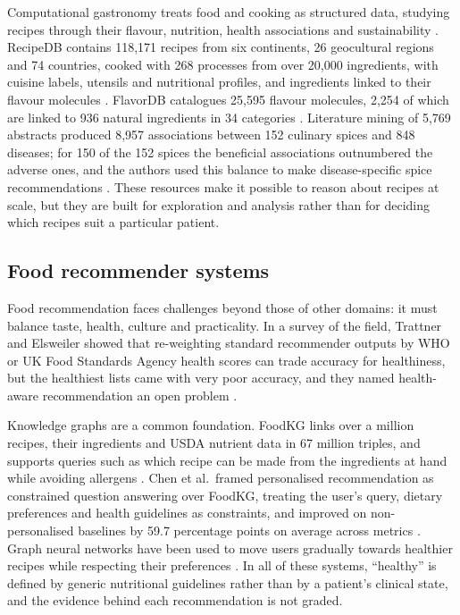 Computational gastronomy treats food and cooking as structured data, studying recipes through their flavour, nutrition, health associations and sustainability \cite{bagler2024gastronomy}. RecipeDB contains 118,171 recipes from six continents, 26 geocultural regions and 74 countries, cooked with 268 processes from over 20,000 ingredients, with cuisine labels, utensils and nutritional profiles, and ingredients linked to their flavour molecules \cite{batra2020recipedb}. FlavorDB catalogues 25,595 flavour molecules, 2,254 of which are linked to 936 natural ingredients in 34 categories \cite{garg2018flavordb}. Literature mining of 5,769 abstracts produced 8,957 associations between 152 culinary spices and 848 diseases; for 150 of the 152 spices the beneficial associations outnumbered the adverse ones, and the authors used this balance to make disease-specific spice recommendations \cite{rakhi2018spices}. These resources make it possible to reason about recipes at scale, but they are built for exploration and analysis rather than for deciding which recipes suit a particular patient.

\subsection{Food recommender systems}

Food recommendation faces challenges beyond those of other domains: it must balance taste, health, culture and practicality. In a survey of the field, Trattner and Elsweiler showed that re-weighting standard recommender outputs by WHO or UK Food Standards Agency health scores can trade accuracy for healthiness, but the healthiest lists came with very poor accuracy, and they named health-aware recommendation an open problem \cite{trattner2017food}.

Knowledge graphs are a common foundation. FoodKG links over a million recipes, their ingredients and USDA nutrient data in 67 million triples, and supports queries such as which recipe can be made from the ingredients at hand while avoiding allergens \cite{haussmann2019foodkg}. Chen et al.\ framed personalised recommendation as constrained question answering over FoodKG, treating the user's query, dietary preferences and health guidelines as constraints, and improved on non-personalised baselines by 59.7 percentage points on average across metrics \cite{chen2021constrained}. Graph neural networks have been used to move users gradually towards healthier recipes while respecting their preferences \cite{li2022healthguided}. In all of these systems, ``healthy'' is defined by generic nutritional guidelines rather than by a patient's clinical state, and the evidence behind each recommendation is not graded.

